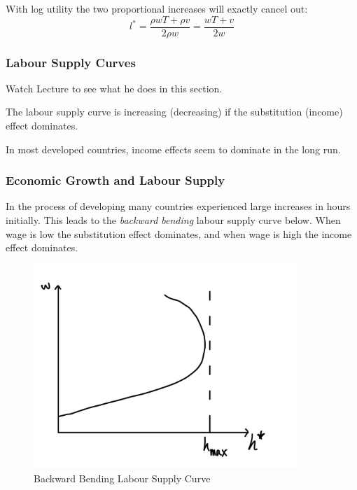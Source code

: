 \documentclass[11pt]{article}
\begin{document}
\begin{example}
    With log utility the two proportional increases will exactly cancel out:
    \[l^* = \dfrac{\rho wT + \rho v}{2 \rho w} = \dfrac{wT+v}{2w}\]
\end{example}

\subsubsection{Labour Supply Curves}
\begin{mdframed}
    Watch Lecture to see what he does in this section.
\end{mdframed}

The labour supply curve is increasing (decreasing) if the substitution (income) effect dominates.

\begin{example}
    In most developed countries, income effects seem to dominate in the long run.
\end{example}

\subsubsection{Economic Growth and Labour Supply}

In the process of developing many countries experienced large increases in hours initially. This leads to the \textit{backward bending} labour supply curve below. When wage is low the substitution effect dominates, and when wage is high the income effect dominates.

\begin{figure}[h]
    \centering
    \includegraphics[width=10cm]{photos/backward bending labour supply.jpeg}
    \caption{Backward Bending Labour Supply Curve}
    \label{fig:backward bending labour supply curve}
\end{figure}
\end{document}
